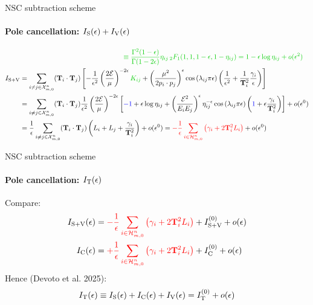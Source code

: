 
\begin{frame}{NSC subtraction scheme}
  \framesubtitle{Pole cancellation: $ I_\text{S}(\epsilon) + I_\text{V}(\epsilon) $}

  \vspace{-2em}

  \small
  \begin{equation*}
    \begin{split}
      & \qquad \qquad \qquad \qquad \qquad \qquad \qquad \quad \textcolor{green!80!black}{\equiv \frac{\Gamma^2(1-\de)}{\Gamma(1-2\de)} \eta_{ij} \,\hyp(1,1,1-\de,1-\eta_{ij}) = 1 - \de \log \eta_{ij} + \smo(\de^2)} \\
      \isvo
      & = \sum_{i \neq j \in \fsp{n}{m}} (\cc) \left[ - \frac{1}{\de^2} \left( \frac{2\ema}{\mu} \right)^{-2\de} \textcolor{green!80!black}{K_{ij}} + \left( \frac{\mu^2}{2p_i \cdot p_j} \right)^\de \cos \left( \lambda_{ij} \pi \de \right) \left( \frac{1}{\de^2} + \frac{1}{\tco_i^2} \frac{\gamma_i}{\de} \right) \right] \\
      & = \sum_{i \neq j \in \fsp{n}{m}} (\cc) \frac{1}{\de^2} \left( \frac{2\ema}{\mu} \right)^{-2\de} \left[ \textcolor{blue}{-1} + \de \log \eta_{ij} + \left( \frac{\ema^2}{E_i E_j} \right)^\de \eta_{ij}^{-\de} \cos \left( \lambda_{ij} \pi \de \right) \left( \textcolor{blue}{1} + \de \frac{\gamma_i}{\tco_i^2} \right) \right] + \smo(\de^0) \\
      & = \frac{1}{\de} \sum_{i \neq j \in \fsp{n}{m}} (\cc) \left( \leg_i + \leg_j + \frac{\gamma_i}{\tco_i^2} \right) + \smo(\de^0) = \textcolor{red}{- \frac{1}{\de} \sum_{i \in \prt{n}{m}} \left( \gamma_i + 2 \tco_i^2 \leg_i \right)} + \smo(\de^0)
    \end{split}
  \end{equation*}

\end{frame}


\begin{frame}{NSC subtraction scheme}
  \framesubtitle{Pole cancellation: $ I_\text{T}(\epsilon) $}

  Compare:
  \begin{equation*}
    \begin{split}
      I_{\text{S}+\text{V}}(\epsilon) = \textcolor{red}{-} & \textcolor{red}{\frac{1}{\epsilon} \sum_{i \in \mathcal{H}^{n}_{m,0}} \left( \gamma_i + 2 \mathbf{T}_i^2 L_i \right)} + I_{\text{S}+\text{V}}^{(0)} + o(\epsilon) \\
      I_\text{C}(\epsilon) = \textcolor{red}{+} & \textcolor{red}{\frac{1}{\epsilon} \sum_{i \in \mathcal{H}^{n}_{m,0}} \left( \gamma_i + 2 \mathbf{T}_i^2 L_i \right)} + I_\text{C}^{(0)} + o(\epsilon)
    \end{split}
  \end{equation*}
  Hence (Devoto et al. 2025):
  \begin{equation*}
    I_\text{T}(\epsilon) \equiv I_\text{S}(\epsilon) + I_\text{C}(\epsilon) + I_\text{V}(\epsilon) = I_\text{T}^{(0)} + o(\epsilon)
  \end{equation*}

\end{frame}

